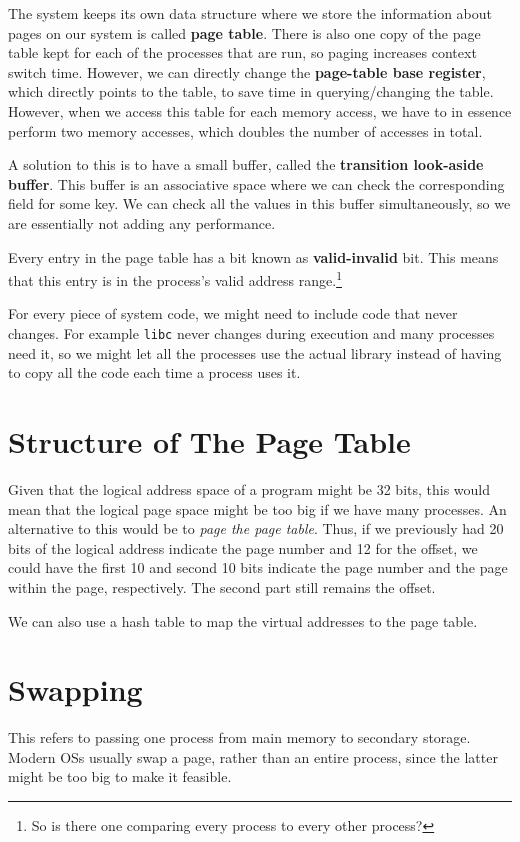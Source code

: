 \documentclass{tufte-handout}
\begin{document}
The system keeps its own data structure where we store the information about pages on our 
system is called \textbf{page table}. There is also one copy of the page table kept for
each of the processes that are run, so paging increases context switch time. However, 
we can directly change the \textbf{page-table base register}, which directly points to the 
table, to save time in querying/changing the table. However, when we access this table 
for each memory access, we have to in essence perform two memory accesses, which doubles
the number of accesses in total.

A solution to this is to have a small buffer, called the \textbf{transition look-aside buffer}.
This buffer is an associative space where we can check the corresponding field for some key.
We can check all the values in this buffer simultaneously, so we are essentially not adding
any performance.

Every entry in the page table has a bit known as \textbf{valid-invalid} bit. This means that
this entry is in the process's valid address range.\footnote{So is there one comparing 
every process to every other process?}

For every piece of system code, we might need to include code that never changes. For example
\texttt{libc} never changes during execution and many processes need it, so we might let 
all the processes use the actual library instead of having to copy all the code each time 
a process uses it. 

\section{Structure of The Page Table}
Given that the logical address space of a program might be 32 bits, this would mean that the 
logical page space might be too big if we have many processes. An alternative to this would 
be to \textit{page the page table}. Thus, if we previously had 20 bits of the logical address
indicate the page number and 12 for the offset, we could have the first 10 and second 10 bits
indicate the page number and the page within the page, respectively. The second part still 
remains the offset.

We can also use a hash table to map the virtual addresses to the page table.

\section{Swapping}

This refers to passing one process from main memory to secondary storage.
Modern OSs usually swap a page, rather than an entire process, since the 
latter might be too big to make it feasible.
\end{document}
